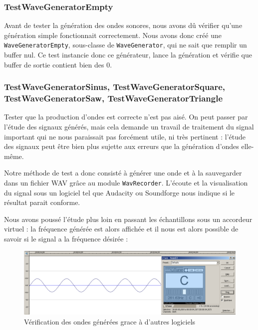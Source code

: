 \subsubsection{TestWaveGeneratorEmpty}

Avant de tester la génération des ondes sonores, nous avons dû
vérifier qu'une génération simple fonctionnait correctement. Nous
avons donc créé une \verb!WaveGeneratorEmpty!, sous-classe de
\verb!WaveGenerator!, qui ne sait que remplir un buffer nul. Ce
test instancie donc ce générateur, lance la génération et vérifie
que buffer de sortie contient bien des 0.

\subsubsection{TestWaveGeneratorSinus, TestWaveGeneratorSquare, TestWaveGeneratorSaw, TestWaveGeneratorTriangle}

Tester que la production d'ondes est correcte n'est pas aisé. On
peut passer par l'étude des signaux générés, mais cela demande un
travail de traitement du signal important qui ne nous paraissait
pas forcément utile, ni très pertinent : l'étude des signaux peut
être bien plus sujette aux erreurs que la génération d'ondes
elle-même.

Notre méthode de test a donc consisté à générer une onde et à la
sauvegarder dans un fichier WAV grâce au module \verb!WavRecorder!.
L'écoute et la visualisation du signal sous un logiciel tel que
Audacity ou Soundforge nous indique si le résultat parait
conforme.

Nous avons poussé l'étude plus loin en passant les échantillons
sous un accordeur virtuel : la fréquence générée est alors affichée
et il nous est alors possible de savoir si le signal a la fréquence
désirée :

\begin{figure}[htb]
\centering
\includegraphics[width=17cm]{../img/png/testWaveGeneratorSinus.png}
\caption{Vérification des ondes générées grace à d'autres logiciels}
\end{figure}

